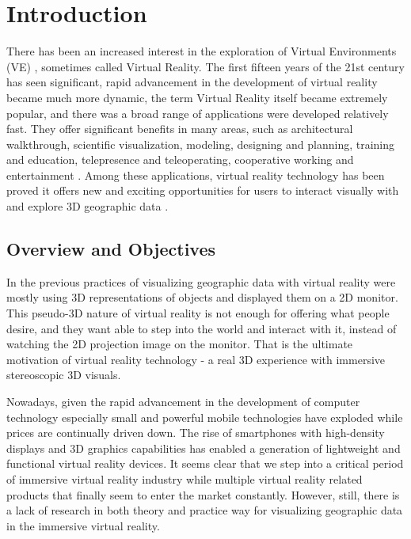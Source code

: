 \label{chapter-introduction}
\chapter{Introduction}

There has been an increased interest in the exploration of Virtual Environments (VE) \cite{huang.java-cgi-vr.2002}, sometimes called Virtual Reality. The first fifteen years of the 21st century has seen significant, rapid advancement in the development of virtual reality became much more dynamic, the term Virtual Reality itself became extremely popular, and there was a broad range of applications were developed relatively fast. They offer significant benefits in many areas, such as architectural walkthrough, scientific visualization, modeling, designing and planning, training and education, telepresence and teleoperating, cooperative working and entertainment \cite{mazuryk.vr.1996}. Among these applications, virtual reality technology has been proved it offers new and exciting opportunities for users to interact visually with and explore 3D geographic data \cite{huang.java-cgi-vr.2002}. 

\section{Overview and Objectives}

In the previous practices of visualizing geographic data with virtual reality were mostly using 3D representations of objects and displayed them on a 2D monitor. This pseudo-3D nature of virtual reality is not enough for offering what people desire, and they want able to step into the world and interact with it, instead of watching the 2D projection image on the monitor. That is the ultimate motivation of virtual reality technology - a real 3D experience with immersive stereoscopic 3D visuals.

Nowadays, given the rapid advancement in the development of computer technology especially small and powerful mobile technologies have exploded while prices are continually driven down. The rise of smartphones with high-density displays and 3D graphics capabilities has enabled a generation of lightweight and functional virtual reality devices. It seems clear that we step into a critical period of immersive virtual reality industry while multiple virtual reality related products that finally seem to enter the market constantly. However, still, there is a lack of research in both theory and practice way for visualizing geographic data in the immersive virtual reality.

